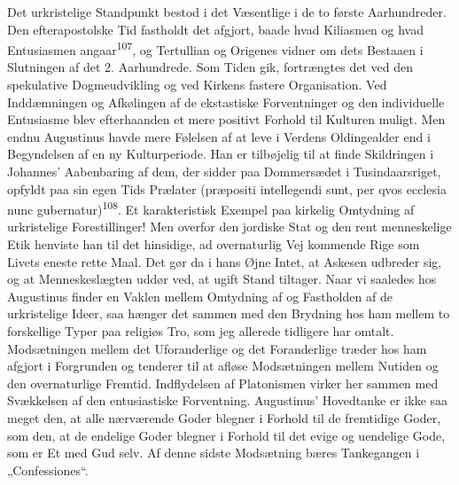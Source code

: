 \documentclass[12pt,a4paper,openany]{book}
\newcommand{\opage}[1]{\marginnote{\footnotesize\textit{[#1]}}}
\begin{document}
Det urkristelige Standpunkt bestod i det Væsentlige i de to første
Aarhundreder. Den efterapostolske Tid fastholdt det afgjort, baade hvad
Kiliasmen og hvad Entusiasmen angaar\textsuperscript{107}, og Tertullian
og Origenes vidner om dets Bestaaen i Slutningen af det 2. Aarhundrede.
Som Tiden gik, fortrængtes det ved den spekulative Dogmeudvikling og ved
Kirkens fastere Organisation. Ved Inddæmningen og Afkølingen af de
ekstastiske Forventninger og den individuelle Entusiasme blev
efterhaanden et mere positivt Forhold til Kulturen muligt. Men endnu
Augustinus havde mere Følelsen af at leve i Verdens Oldingealder end i
Begyndelsen af en ny Kulturperiode. Han er tilbøjelig til at finde
Skildringen i Johannes’ Aabenbaring af dem, der sidder paa Dommersædet i
Tusindaarsriget, opfyldt paa sin egen Tids Prælater (præpositi
intellegendi sunt, per qvos ecclesia nunc
gubernatur)\textsuperscript{108}. Et karakteristisk Exempel paa kirkelig
Omtydning af urkristelige Forestillinger! Men overfor den jordiske Stat
og den rent menneskelige Etik henviste han til det hinsidige, ad
overnaturlig Vej kommende Rige som Livets eneste rette Maal. Det gør da
i hans Øjne Intet, at Askesen udbreder sig, og at Menneskeslægten uddør
ved, at ugift Stand tiltager. Naar vi saaledes hos Augustinus finder en
Vaklen mellem Omtydning af og Fastholden af de urkristelige Ideer, saa
hænger det sammen med den Brydning hos ham mellem to forskellige Typer
paa religiøs Tro, som jeg allerede tidligere har omtalt. Modsætningen
mellem det Uforanderlige og det Foranderlige træder hos ham afgjort i
Forgrunden og tenderer til at afløse Modsætningen mellem Nutiden og den
overnaturlige Fremtid. Indflydelsen af Platonismen virker her sammen med
Svækkelsen af den entusiastiske Forventning. Augustinus’ Hovedtanke er
ikke saa meget den, at alle nærværende Goder blegner i Forhold til de
fremtidige Goder, som den, at de endelige Goder blegner i Forhold til
det evige og uendelige Gode, som er Et
\opage{232}med Gud selv. Af denne sidste Modsætning bæres Tankegangen i
„Confessiones“.
\end{document}
